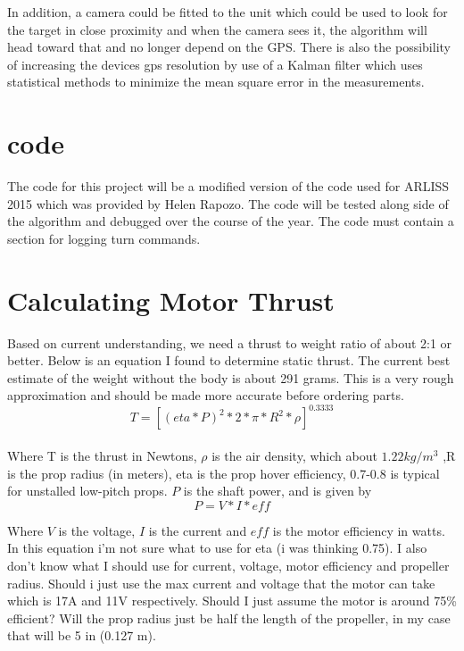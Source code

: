 \documentclass[10pt,a4paper]{article}
\begin{document}
In addition, a camera could be fitted to the unit which could be used to look for the target in close proximity and when the camera sees it, the algorithm will head toward that and no longer depend on the GPS. There is also the possibility of increasing the devices gps resolution by use of a Kalman filter which uses statistical methods to minimize the mean square error in the measurements. 

\section{code}
The code for this project will be a modified version of the code used for ARLISS 2015 which was provided by Helen Rapozo. The code will be tested along side of the algorithm and debugged over the course of the year. The code must contain a section for logging turn commands. 


\section{Calculating Motor Thrust}
Based on current understanding, we need a thrust to weight ratio of about 2:1 or better. Below is an equation I found to determine static thrust. The current best estimate of the weight without the body is about 291 grams. This is a very rough approximation and should be made more accurate before ordering parts.\\

\begin{equation} T = [ (eta*P)^2 * 2 * \pi *R^2 * \rho ]^{0.3333}\end{equation}\\

Where T is the thrust in Newtons, $\rho$ is the air density, which about $1.22 kg/m^3$
,R is the prop radius (in meters), eta is the prop hover efficiency, 0.7-0.8 is typical for unstalled low-pitch props. $P$ is the shaft power, and is given by\\
\begin{equation}P = V * I * eff \end{equation}

Where $V$ is the voltage, $I$ is the current and $eff$ is the motor efficiency in watts.\\



In this equation i'm not sure what to use for eta (i was thinking 0.75). I also don't know what I should use for current, voltage, motor efficiency and propeller radius. Should i just use the max current and voltage that the motor can take which is 17A and 11V respectively. Should I just assume the motor is around 75\% efficient? Will the prop radius just be half the length of the propeller, in my case that will be 5 in (0.127 m).
\end{document}
